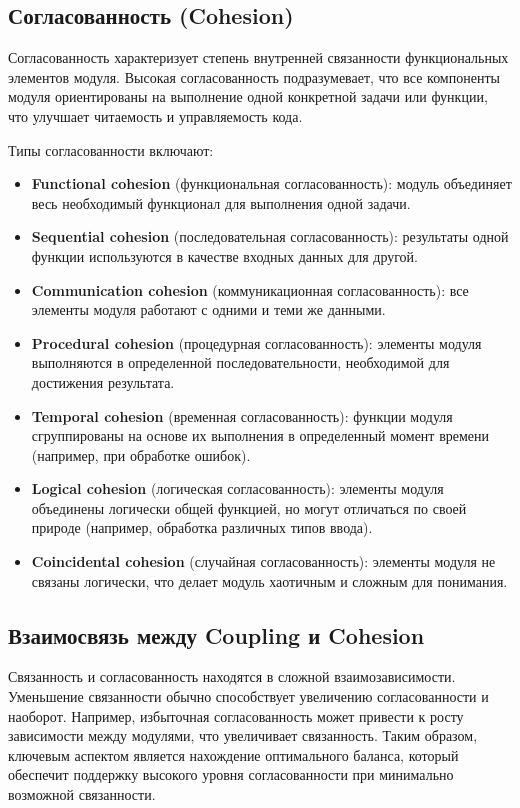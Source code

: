 \subsection*{Согласованность (Cohesion)}

Согласованность характеризует степень внутренней связанности функциональных элементов модуля. Высокая согласованность подразумевает, что все компоненты модуля ориентированы на выполнение одной конкретной задачи или функции, что улучшает читаемость и управляемость кода.

Типы согласованности включают:

\begin{itemize}
    \item \textbf{Functional cohesion} (функциональная согласованность): модуль объединяет весь необходимый функционал для выполнения одной задачи.
    \item \textbf{Sequential cohesion} (последовательная согласованность): результаты одной функции используются в качестве входных данных для другой.
    \item \textbf{Communication cohesion} (коммуникационная согласованность): все элементы модуля работают с одними и теми же данными.
    \item \textbf{Procedural cohesion} (процедурная согласованность): элементы модуля выполняются в определенной последовательности, необходимой для достижения результата.
    \item \textbf{Temporal cohesion} (временная согласованность): функции модуля сгруппированы на основе их выполнения в определенный момент времени (например, при обработке ошибок).
    \item \textbf{Logical cohesion} (логическая согласованность): элементы модуля объединены логически общей функцией, но могут отличаться по своей природе (например, обработка различных типов ввода).
    \item \textbf{Coincidental cohesion} (случайная согласованность): элементы модуля не связаны логически, что делает модуль хаотичным и сложным для понимания.
\end{itemize}

\subsection*{Взаимосвязь между Coupling и Cohesion}

Связанность и согласованность находятся в сложной взаимозависимости. Уменьшение связанности обычно способствует увеличению согласованности и наоборот. Например, избыточная согласованность может привести к росту зависимости между модулями, что увеличивает связанность. Таким образом, ключевым аспектом является нахождение оптимального баланса, который обеспечит поддержку высокого уровня согласованности при минимально возможной связанности.

